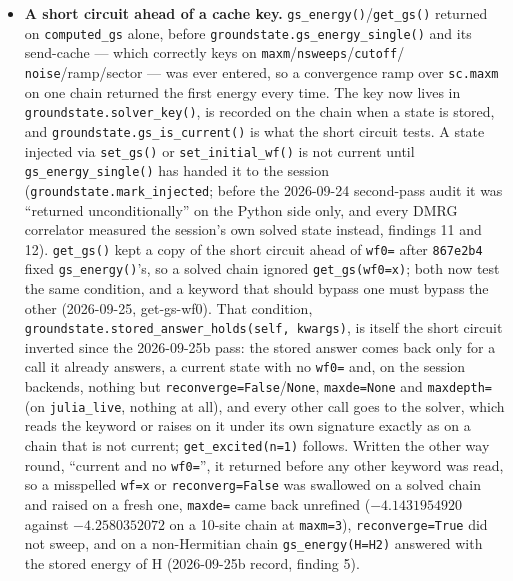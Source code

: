 \documentclass[11pt]{article}
\begin{document}
\begin{itemize}
  \item \textbf{A short circuit ahead of a cache key.}
    \texttt{gs\_energy()}/\texttt{get\_gs()} returned on
    \texttt{computed\_gs} alone, before
    \texttt{groundstate.gs\_energy\_single()} and its send-cache --- which
    correctly keys on \texttt{maxm}/\texttt{nsweeps}/\texttt{cutoff}/
    \texttt{noise}/ramp/sector --- was ever entered, so a convergence ramp
    over \texttt{sc.maxm} on one chain returned the first energy every
    time. The key now lives in \texttt{groundstate.solver\_key()}, is
    recorded on the chain when a state is stored, and
    \texttt{groundstate.gs\_is\_current()} is what the short circuit
    tests. A state injected via \texttt{set\_gs()} or
    \texttt{set\_initial\_wf()} is not current until
    \texttt{gs\_energy\_single()} has handed it to the session
    (\texttt{groundstate.mark\_injected}; before the 2026-09-24
    second-pass audit it was ``returned unconditionally'' on the Python
    side only, and every DMRG correlator measured the session's own
    solved state instead, findings 11 and 12). \texttt{get\_gs()} kept a
    copy of the short circuit ahead of \texttt{wf0=} after
    \texttt{867e2b4} fixed \texttt{gs\_energy()}'s, so a solved chain
    ignored \texttt{get\_gs(wf0=x)}; both now test the same condition, and
    a keyword that should bypass one must bypass the other (2026-09-25,
    get-gs-wf0). That condition,
    \texttt{groundstate.stored\_answer\_holds(self, kwargs)}, is itself the
    short circuit inverted since the 2026-09-25b pass: the stored answer
    comes back only for a call it already answers, a current state with no
    \texttt{wf0=} and, on the session backends, nothing but
    \texttt{reconverge=False}/\texttt{None}, \texttt{maxde=None} and
    \texttt{maxdepth=} (on \texttt{julia\_live}, nothing at all), and every
    other call goes to the solver, which reads the keyword or raises on it
    under its own signature exactly as on a chain that is not current;
    \texttt{get\_excited(n=1)} follows. Written the other way round,
    ``current and no \texttt{wf0=}'', it returned before any other keyword
    was read, so a misspelled \texttt{wf=x} or \texttt{reconverg=False} was
    swallowed on a solved chain and raised on a fresh one, \texttt{maxde=}
    came back unrefined ($-4.1431954920$ against $-4.2580352072$ on a
    10-site chain at \texttt{maxm=3}), \texttt{reconverge=True} did not
    sweep, and on a non-Hermitian chain \texttt{gs\_energy(H=H2)} answered
    with the stored energy of H (2026-09-25b record, finding 5).

\end{itemize}
\end{document}
